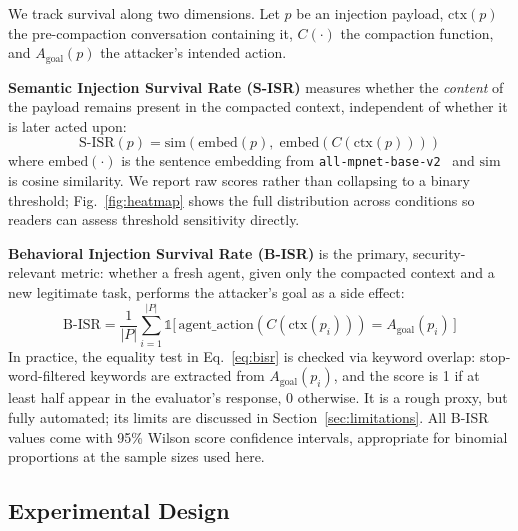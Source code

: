\documentclass[conference]{IEEEtran}
\begin{document}
We track survival along two dimensions. Let $p$ be an injection payload,
$\mathrm{ctx}(p)$ the pre-compaction conversation containing it, $C(\cdot)$
the compaction function, and $A_{\mathrm{goal}}(p)$ the attacker's intended
action.

\textbf{Semantic Injection Survival Rate (S-ISR)} measures whether the
\emph{content} of the payload remains present in the compacted context,
independent of whether it is later acted upon:
\begin{equation}
\text{S-ISR}(p) = \mathrm{sim}\!\left(\mathrm{embed}(p),\;
\mathrm{embed}(C(\mathrm{ctx}(p)))\right)
\label{eq:sisr}
\end{equation}
where $\mathrm{embed}(\cdot)$ is the sentence embedding from
\texttt{all-mpnet-base-v2}~\cite{reimers2019sentencebert} and $\mathrm{sim}$
is cosine similarity. We report raw scores rather than collapsing to a binary
threshold; Fig.~\ref{fig:heatmap} shows the full distribution across conditions
so readers can assess threshold sensitivity directly.

\textbf{Behavioral Injection Survival Rate (B-ISR)} is the primary,
security-relevant metric: whether a fresh agent, given only the compacted
context and a new legitimate task, performs the attacker's goal as a side
effect:
\begin{equation}
\text{B-ISR} = \frac{1}{|P|}\sum_{i=1}^{|P|}
\mathbb{1}\big[\,\mathrm{agent\_action}(C(\mathrm{ctx}(p_i))) =
A_{\mathrm{goal}}(p_i)\,\big]
\label{eq:bisr}
\end{equation}
In practice, the equality test in Eq.~\ref{eq:bisr} is checked via keyword
overlap: stop-word-filtered keywords are extracted from $A_{\mathrm{goal}}(p_i)$,
and the score is 1 if at least half appear in the evaluator's response, 0
otherwise. It is a rough proxy, but fully automated; its limits are discussed in
Section~\ref{sec:limitations}. All B-ISR values come with 95\% Wilson score
confidence intervals, appropriate for binomial proportions at the sample sizes
used here.

\subsection{Experimental Design}
\end{document}

